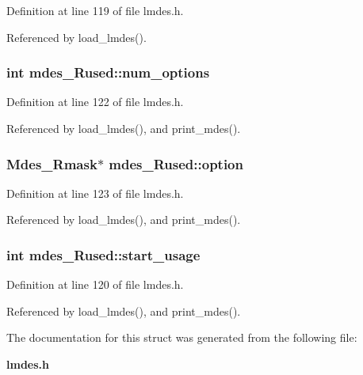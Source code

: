 Definition at line 119 of file lmdes.h.

Referenced by load\_\-lmdes().
\subsubsection{\setlength{\rightskip}{0pt plus 5cm}int \bf{mdes\_\-Rused::num\_\-options}}\label{structmdes__Rused_8f67008d709d238be2749f3d3258a902}




Definition at line 122 of file lmdes.h.

Referenced by load\_\-lmdes(), and print\_\-mdes().
\subsubsection{\setlength{\rightskip}{0pt plus 5cm}\bf{Mdes\_\-Rmask}$\ast$ \bf{mdes\_\-Rused::option}}\label{structmdes__Rused_8dc184ff98659df860bfa13e4cefa36d}




Definition at line 123 of file lmdes.h.

Referenced by load\_\-lmdes(), and print\_\-mdes().
\subsubsection{\setlength{\rightskip}{0pt plus 5cm}int \bf{mdes\_\-Rused::start\_\-usage}}\label{structmdes__Rused_448cdf5c17b6fb5bc6bd285af0b8bd28}




Definition at line 120 of file lmdes.h.

Referenced by load\_\-lmdes(), and print\_\-mdes().

The documentation for this struct was generated from the following file:\begin{CompactItemize}
\item 
\bf{lmdes.h}\end{CompactItemize}
